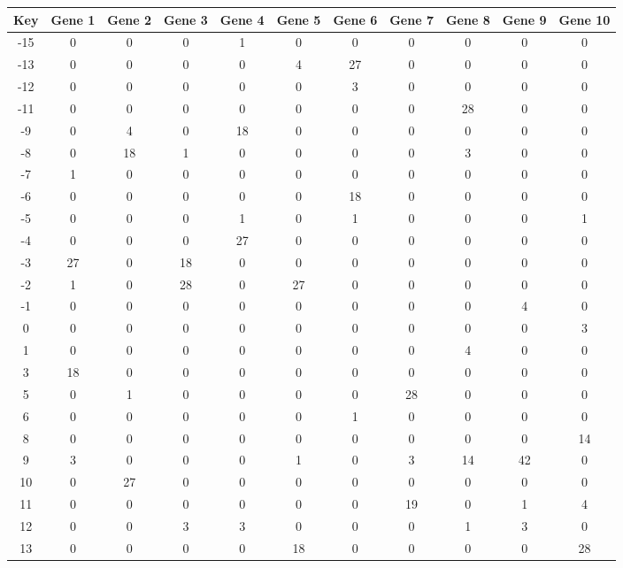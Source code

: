 \begin{tabular}{|c|c|c|c|c|c|c|c|c|c|c|}
\hline
Key & Gene 1 & Gene 2 & Gene 3 & Gene 4 & Gene 5 & Gene 6 & Gene 7 & Gene 8 & Gene 9 & Gene 10 \\
\hline
-15 & 0 & 0 & 0 & 1 & 0 & 0 & 0 & 0 & 0 & 0 \\
-13 & 0 & 0 & 0 & 0 & 4 & 27 & 0 & 0 & 0 & 0 \\
-12 & 0 & 0 & 0 & 0 & 0 & 3 & 0 & 0 & 0 & 0 \\
-11 & 0 & 0 & 0 & 0 & 0 & 0 & 0 & 28 & 0 & 0 \\
-9 & 0 & 4 & 0 & 18 & 0 & 0 & 0 & 0 & 0 & 0 \\
-8 & 0 & 18 & 1 & 0 & 0 & 0 & 0 & 3 & 0 & 0 \\
-7 & 1 & 0 & 0 & 0 & 0 & 0 & 0 & 0 & 0 & 0 \\
-6 & 0 & 0 & 0 & 0 & 0 & 18 & 0 & 0 & 0 & 0 \\
-5 & 0 & 0 & 0 & 1 & 0 & 1 & 0 & 0 & 0 & 1 \\
-4 & 0 & 0 & 0 & 27 & 0 & 0 & 0 & 0 & 0 & 0 \\
-3 & 27 & 0 & 18 & 0 & 0 & 0 & 0 & 0 & 0 & 0 \\
-2 & 1 & 0 & 28 & 0 & 27 & 0 & 0 & 0 & 0 & 0 \\
-1 & 0 & 0 & 0 & 0 & 0 & 0 & 0 & 0 & 4 & 0 \\
0 & 0 & 0 & 0 & 0 & 0 & 0 & 0 & 0 & 0 & 3 \\
1 & 0 & 0 & 0 & 0 & 0 & 0 & 0 & 4 & 0 & 0 \\
3 & 18 & 0 & 0 & 0 & 0 & 0 & 0 & 0 & 0 & 0 \\
5 & 0 & 1 & 0 & 0 & 0 & 0 & 28 & 0 & 0 & 0 \\
6 & 0 & 0 & 0 & 0 & 0 & 1 & 0 & 0 & 0 & 0 \\
8 & 0 & 0 & 0 & 0 & 0 & 0 & 0 & 0 & 0 & 14 \\
9 & 3 & 0 & 0 & 0 & 1 & 0 & 3 & 14 & 42 & 0 \\
10 & 0 & 27 & 0 & 0 & 0 & 0 & 0 & 0 & 0 & 0 \\
11 & 0 & 0 & 0 & 0 & 0 & 0 & 19 & 0 & 1 & 4 \\
12 & 0 & 0 & 3 & 3 & 0 & 0 & 0 & 1 & 3 & 0 \\
13 & 0 & 0 & 0 & 0 & 18 & 0 & 0 & 0 & 0 & 28 \\
\hline
\end{tabular}